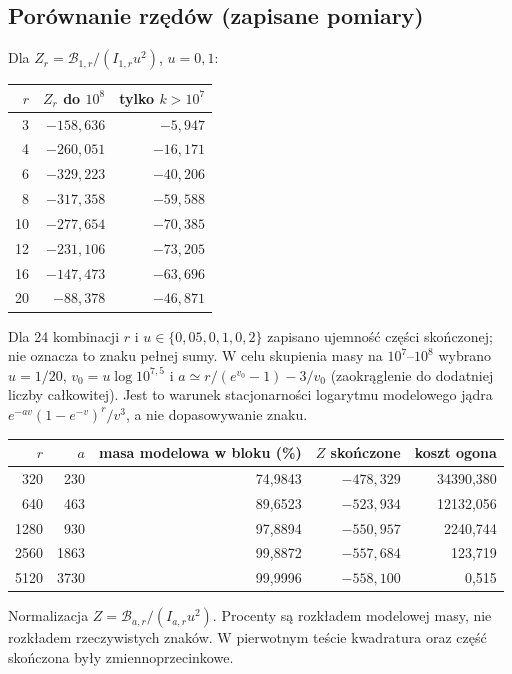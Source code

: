 \documentclass[11pt,a4paper]{article}
\theoremstyle{definition}\newtheorem{defn}[tw]{Definicja}
\theoremstyle{remark}\newtheorem*{uw}{Uwaga}
\newcommand{\B}{\mathcal B}
\begin{document}
\subsection{Porównanie rzędów (zapisane pomiary)}
Dla $Z_r=\B_{1,r}/(I_{1,r}u^2)$, $u=0{,}1$:
\begin{center}
\begin{tabular}{rrr}
\toprule $r$&$Z_r$ do $10^8$&tylko $k>10^7$\\\midrule
3&$-158{,}636$&$-5{,}947$\\4&$-260{,}051$&$-16{,}171$\\
6&$-329{,}223$&$-40{,}206$\\8&$-317{,}358$&$-59{,}588$\\
10&$-277{,}654$&$-70{,}385$\\12&$-231{,}106$&$-73{,}205$\\
16&$-147{,}473$&$-63{,}696$\\20&$-88{,}378$&$-46{,}871$\\\bottomrule
\end{tabular}
\end{center}
Dla 24 kombinacji $r$ i $u\in\{0{,}05,0{,}1,0{,}2\}$ zapisano ujemność
części skończonej; nie oznacza to znaku pełnej sumy. W celu skupienia masy
na $10^7$--$10^8$ wybrano $u=1/20$, $v_0=u\log 10^{7{,}5}$ i
$a\simeq r/(e^{v_0}-1)-3/v_0$ (zaokrąglenie do dodatniej liczby całkowitej).
Jest to warunek stacjonarności logarytmu modelowego jądra
$e^{-av}(1-e^{-v})^r/v^3$, a nie dopasowywanie znaku.
\begin{center}
\begin{tabular}{rrrrr}
\toprule $r$&$a$&masa modelowa w bloku (\%)&$Z$ skończone&koszt ogona\\\midrule
320&230&74,9843&$-478{,}329$&34390,380\\
640&463&89,6523&$-523{,}934$&12132,056\\
1280&930&97,8894&$-550{,}957$&2240,744\\
2560&1863&99,8872&$-557{,}684$&123,719\\
5120&3730&99,9996&$-558{,}100$&0,515\\\bottomrule
\end{tabular}
\end{center}
Normalizacja $Z=\B_{a,r}/(I_{a,r}u^2)$. Procenty są rozkładem modelowej
masy, nie rozkładem rzeczywistych znaków. W pierwotnym teście kwadratura
oraz część skończona były zmiennoprzecinkowe.
\end{document}
